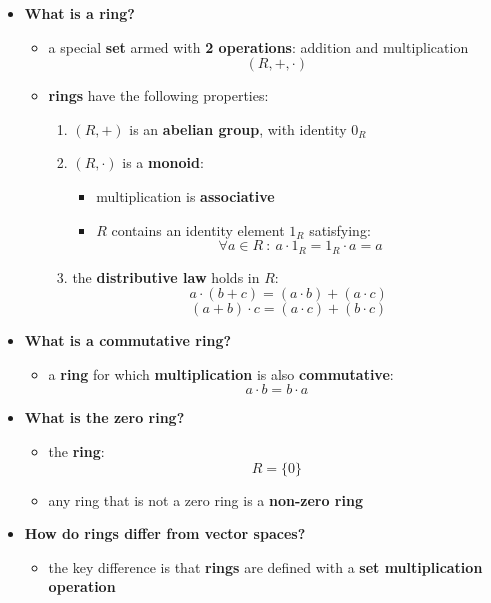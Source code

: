 \documentclass{exam}
\begin{document}
\begin{itemize}
    \item \textbf{What is a ring?}
    \begin{itemize}
        \item a special \textbf{set} armed with \textbf{2 operations}: addition and multiplication
        \[
        (R, +, \cdot)
        \]
        \item \textbf{rings} have the following properties:
        \begin{enumerate}
            \item $(R,+)$ is an \textbf{abelian group}, with identity $0_R$
            \item $(R, \cdot)$ is a \textbf{monoid}:
            \begin{itemize}
                \item multiplication is \textbf{associative}
                \item $R$ contains an identity element $1_R$ satisfying:
                \[
                \forall a \in R \ : \ a \cdot 1_R = 1_R \cdot a = a
                \]
            \end{itemize}
            \item the \textbf{distributive law} holds in $R$:
            \[
            a \cdot (b + c) = (a \cdot b) + (a \cdot c)
            \]
            \[
            (a + b) \cdot c = (a \cdot c) + (b \cdot c)
            \]
        \end{enumerate}
    \end{itemize}
    \item \textbf{What is a commutative ring?}
    \begin{itemize}
        \item a \textbf{ring} for which \textbf{multiplication} is also \textbf{commutative}:
        \[
        a \cdot b = b \cdot a
        \]
    \end{itemize}
    \item \textbf{What is the zero ring?}
    \begin{itemize}
        \item the \textbf{ring}:
        \[
        R = \{0\}
        \]
        \item any ring that is not a zero ring is a \textbf{non-zero ring}
    \end{itemize}
    \item \textbf{How do rings differ from vector spaces?}
    \begin{itemize}
        \item the key difference is that \textbf{rings} are defined with a \textbf{set multiplication operation}

\end{itemize}
\end{itemize}
\end{document}
